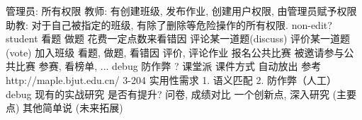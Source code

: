 \markdownRendererUlEndTight \markdownRendererInterblockSeparator
{}\markdownRendererInterblockSeparator
{}\markdownRendererUlBeginTight
\markdownRendererUlItem 管理员: 所有权限\markdownRendererUlItemEnd 
\markdownRendererUlItem 教师: 有创建班级, 发布作业, 创建用户权限, 由管理员赋予权限\markdownRendererUlItemEnd 
\markdownRendererUlItem 助教: 对于自己被指定的班级, 有除了删除等危险操作的所有权限.\markdownRendererUlItemEnd 
\markdownRendererUlItem non-edit?\markdownRendererUlItemEnd 
\markdownRendererUlItem student\markdownRendererUlItemEnd 
\markdownRendererUlEndTight \markdownRendererInterblockSeparator
{}\markdownRendererInterblockSeparator
{}\markdownRendererInterblockSeparator
{}\markdownRendererUlBeginTight
\markdownRendererUlItem 看题\markdownRendererUlItemEnd 
\markdownRendererUlItem 做题\markdownRendererUlItemEnd 
\markdownRendererUlItem 花费一定点数来看错因\markdownRendererUlItemEnd 
\markdownRendererUlItem 评论某一道题(discuss)\markdownRendererUlItemEnd 
\markdownRendererUlItem 评价某一道题(vote)\markdownRendererUlItemEnd 
\markdownRendererUlEndTight \markdownRendererInterblockSeparator
{}\markdownRendererInterblockSeparator
{}\markdownRendererUlBeginTight
\markdownRendererUlItem 加入班级\markdownRendererUlItemEnd 
\markdownRendererUlItem 看题, 做题, 看错因\markdownRendererUlItemEnd 
\markdownRendererUlItem 评价, 评论作业\markdownRendererUlItemEnd 
\markdownRendererUlItem \markdownRendererUlItemEnd 
\markdownRendererUlEndTight \markdownRendererInterblockSeparator
{}\markdownRendererInterblockSeparator
{}\markdownRendererUlBeginTight
\markdownRendererUlItem 报名公共比赛\markdownRendererUlItemEnd 
\markdownRendererUlItem 被邀请参与公共比赛\markdownRendererUlItemEnd 
\markdownRendererUlItem 参赛, 看榜单, ...\markdownRendererUlItemEnd 
\markdownRendererUlEndTight \markdownRendererInterblockSeparator
{}\markdownRendererInterblockSeparator
{}debug 防作弊 ? 课堂派 课件方式 自动放出 参考  http://maple.bjut.edu.cn/ 3-204\markdownRendererInterblockSeparator
{}实用性需求 1. 语义匹配 2. 防作弊（人工）\markdownRendererInterblockSeparator
{}debug\markdownRendererInterblockSeparator
{}现有的实战研究 是否有提升?\markdownRendererInterblockSeparator
{}问卷, 成绩对比\markdownRendererInterblockSeparator
{}一个创新点, 深入研究 (主要点) 其他简单说 (未来拓展)\markdownRendererInterblockSeparator

